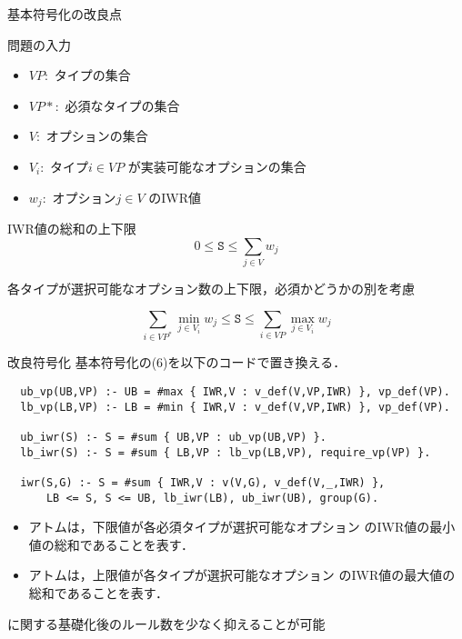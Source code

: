 \documentclass[dvipdfmx, 11pt]{beamer}
\begin{document}
\begin{frame}{基本符号化の改良点}
 \begin{block}{問題の入力}
  \begin{itemize}
   \item $VP$:\ タイプの集合
   \item $VP*$:\ 必須なタイプの集合
   \item $V$:\ オプションの集合
   \item $V_i$:\ タイプ$i \in VP$ が実装可能なオプションの集合
   \item $w_j$:\ オプション$j \in V$ のIWR値
  \end{itemize}
 \end{block}
 \begin{block}{IWR値の総和の上下限}
  \[
   0 \leq \texttt{S} \leq \sum_{j\in V}w_{j}
  \]
 \end{block}
 \alert{各タイプが選択可能なオプション数の上下限，必須かどうかの別を考慮}
 \begin{alertblock}{}
  \[
   \sum_{i\in VP^{*}}\min_{j\in V_{i}}w_{j}
   \leq \texttt{S} \leq
   \sum_{i\in VP}\max_{j\in V_{i}}w_{j}
  \]
 \end{alertblock}
\end{frame}
\begin{frame}[fragile]{改良符号化}
 基本符号化の(6)を以下のコードで置き換える．
\begin{exampleblock}{}
 \footnotesize
 \begin{lstlisting}
  ub_vp(UB,VP) :- UB = #max { IWR,V : v_def(V,VP,IWR) }, vp_def(VP).
  lb_vp(LB,VP) :- LB = #min { IWR,V : v_def(V,VP,IWR) }, vp_def(VP).

  ub_iwr(S) :- S = #sum { UB,VP : ub_vp(UB,VP) }.
  lb_iwr(S) :- S = #sum { LB,VP : lb_vp(LB,VP), require_vp(VP) }.

  iwr(S,G) :- S = #sum { IWR,V : v(V,G), v_def(V,_,IWR) },
      LB <= S, S <= UB, lb_iwr(LB), ub_iwr(UB), group(G).
 \end{lstlisting}
\end{exampleblock}
 \begin{itemize}
  \item アトムは，下限値が各必須タイプが選択可能なオプション
	のIWR値の最小値の総和であることを表す．
  \item アトムは，上限値が各タイプが選択可能なオプション
	のIWR値の最大値の総和であることを表す．
 \end{itemize}
 \begin{block}{}
  に関する基礎化後のルール数を少なく抑えることが可能
 \end{block}
\end{frame}
\end{document}
